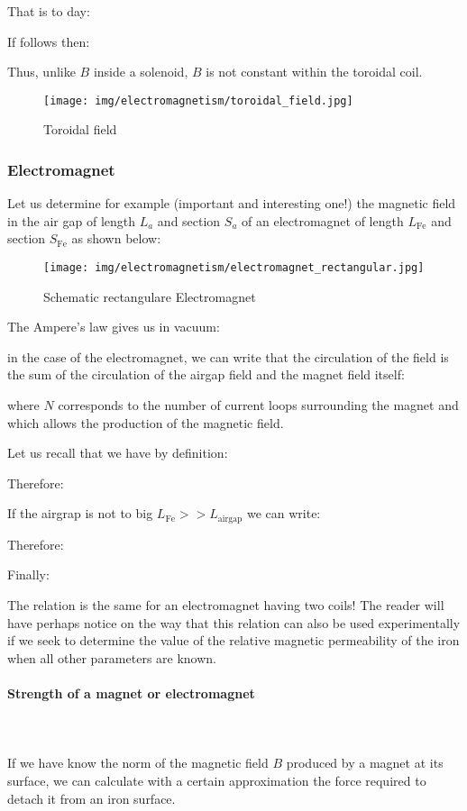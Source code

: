 	That is to day:
	
	If follows then:
	
	Thus, unlike $B$ inside a solenoid, $B$ is not constant within the toroidal coil.
	\begin{figure}[H]
		\centering
		\texttt{[image: img/electromagnetism/toroidal\_field.jpg]}
		\caption{Toroidal field}
	\end{figure}
	
	\pagebreak
	\subsubsection{Electromagnet}
	Let us determine for example (important and interesting one!) the magnetic field in the air gap of length $L_a$ and section $S_a$ of an electromagnet of length $L_{\text{Fe}}$ and section $S_{\text{Fe}}$ as shown below:
	\begin{figure}[H]
		\centering
		\texttt{[image: img/electromagnetism/electromagnet\_rectangular.jpg]}
		\caption{Schematic rectangulare Electromagnet}
	\end{figure}
	The Ampere's law gives us in vacuum:
	
	in the case of the electromagnet, we can write that the circulation of the field is the sum of the circulation of the airgap field and the magnet field itself:
	
	where $N$ corresponds to the number of current loops surrounding the magnet and which allows the production of the magnetic field.
	
	Let us recall that we have by definition:
	
	Therefore:
	
	If the airgrap is not to big $L_\text{Fe}>>L_\text{airgap}$ we can write:
	
	Therefore:
	
	Finally:
	
	The relation is the same for an electromagnet having two coils! The reader will have perhaps notice on the way that this relation can also be used experimentally if we seek to determine the value of the relative magnetic permeability of the iron when all other parameters are known.
	
	\paragraph{Strength of a magnet or electromagnet}\mbox{}\\\\
	If we have know the norm of the magnetic field $B$ produced by a magnet at its surface, we can calculate with a certain approximation the force required to detach it from an iron surface.
	
